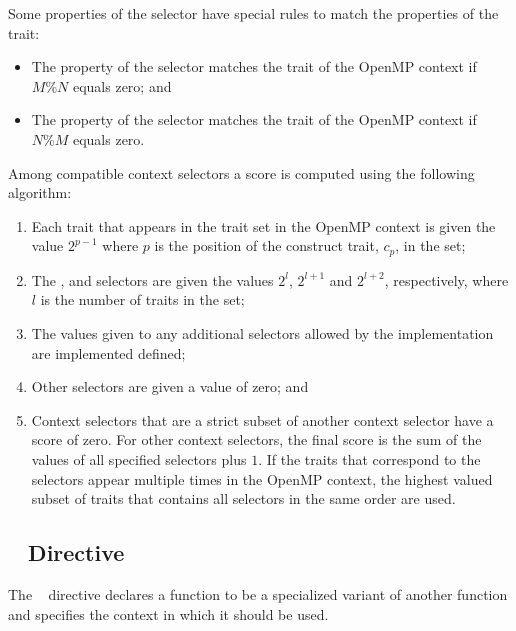 Some properties of the  selector have special rules to match the 
properties of the  trait:

\begin{itemize}
\item The \code{)} property of the selector matches the
       trait of the OpenMP context if $M \% N$ equals zero; and
\item The \code{)} property of the selector matches 
      the  trait of the OpenMP context if $N \% M$ equals zero.
\end{itemize}

Among compatible context selectors a score is computed using the following algorithm:

\begin{enumerate}
\item Each trait that appears in the  trait set in the OpenMP context 
      is given the value $2^{p-1}$ where $p$ is the position of the construct trait,
      $c_{p}$, in the set;
\item The ,  and  selectors are given the
      values $2^{l}$, $2^{l+1}$ and $2^{l+2}$, respectively, where $l$ is 
      the number of traits in the  set;
\item The values given to any additional selectors allowed by the implementation 
      are implemented defined; 
\item Other selectors are given a value of zero; and
\item Context selectors that are a strict subset of another context selector
      have a score of zero. For other context selectors, the final score is the
      sum of the values of all specified selectors plus $1$. If the traits
      that correspond to the  selectors appear multiple times 
      in the OpenMP context, the highest valued subset of traits that contains 
      all selectors in the same order are used.
\end{enumerate}

\subsection{~ Directive}
\label{subsec:declare variant Directive}
\summary
The ~ directive declares a function to be a
specialized variant of another function and specifies the context in which it
should be used.

